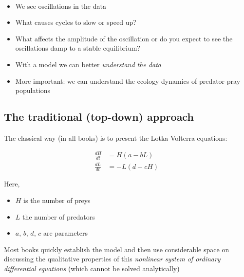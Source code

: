 \documentclass[%
oneside,                 %
final,                   %
10pt]{article}
\begin{document}
\paragraph{}
\begin{itemize}
 \item We see oscillations in the data

 \item What causes cycles to slow or speed up?

 \item What affects the amplitude of the oscillation or do you expect to see the oscillations damp to a stable equilibrium?

 \item With a model we can better \emph{understand the data}

 \item More important: we can understand the ecology dynamics of
   predator-pray populations
\end{itemize}

\noindent




\subsection{The traditional (top-down) approach}


\paragraph{}
The classical way (in all books) is to present the Lotka-Volterra equations:

\begin{align*}
\frac{dH}{dt} &= H(a - b L)\\ 
\frac{dL}{dt} &= - L(d - c  H)
\end{align*}

Here,

\begin{itemize}
 \item $H$ is the number of preys

 \item $L$ the number of predators

 \item $a$, $b$, $d$, $c$ are parameters
\end{itemize}

\noindent
Most books quickly establish the model and then use considerable space on
discussing the qualitative properties of this \emph{nonlinear system of
ordinary differential equations} (which cannot be solved analytically)
\end{document}
